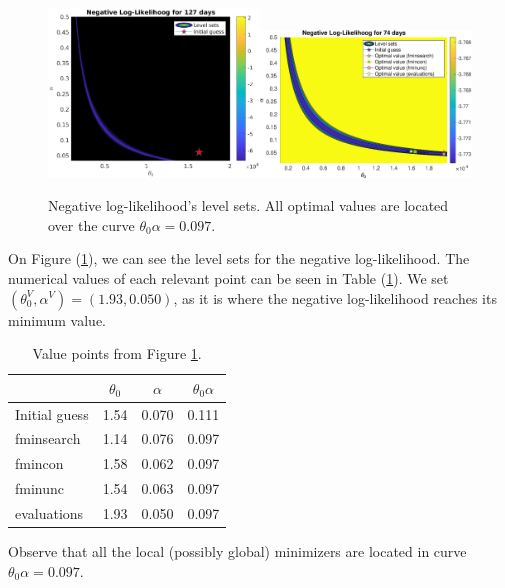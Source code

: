 \documentclass[11pt]{article}
\theoremstyle{definition}
\begin{document}
\begin{figure}[H]
\centering
\includegraphics[width=0.5\textwidth]{../../MATLAB_Files/Results/likelihood/normal/Log-Likelihood.eps}\includegraphics[width=0.5\textwidth]{../../MATLAB_Files/Results/likelihood/normal/Log-Likelihood_testing.eps}
\caption{Negative log-likelihood's level sets. All optimal values are located over the curve $\theta_0\alpha=0.097$.}
\label{fig:neg-LL}
\end{figure}
On Figure (\ref{fig:neg-LL}), we can see the level sets for the negative log-likelihood. The numerical values of each relevant point can be seen in Table (\ref{tab:optimal_values}). We set $(\theta_0^V,\alpha^V)=(1.93,0.050)$, as it is where the negative log-likelihood reaches its minimum value.
\begin{table}[H]
\centering
\begin{tabular}{lccc}
\toprule
 & $\theta_0$ & $\alpha$ & $\theta_0\alpha$\\
 \midrule
 Initial guess & 1.54 & 0.070 & 0.111 \\
 fminsearch & 1.14 & 0.076 & 0.097 \\
 fmincon & 1.58 & 0.062 & 0.097 \\
 fminunc & 1.54 & 0.063 & 0.097 \\
 evaluations & 1.93 & 0.050 & 0.097 \\
 \bottomrule
\end{tabular}
\caption{Value points from Figure \ref{fig:neg-LL}.}
\label{tab:optimal_values}
\end{table}
Observe that all the local (possibly global) minimizers are located in curve $\theta_0\alpha=0.097$.
\end{document}
